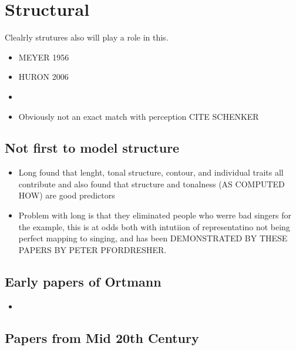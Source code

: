 \documentclass[]{book}
\providecommand{\tightlist}{%
  \setlength{\itemsep}{0pt}\setlength{\parskip}{0pt}}
\theoremstyle{definition}
\theoremstyle{definition}
\theoremstyle{definition}
\theoremstyle{remark}
\begin{document}
\hypertarget{structural}{%
\section{Structural}\label{structural}}

Clealrly strutures also will play a role in this.

\begin{itemize}
\item
  MEYER 1956
\item
  HURON 2006
\item
  \citep{margulisModelMelodicExpectation2005}
\item
  Obviously not an exact match with perception CITE SCHENKER
\end{itemize}

\hypertarget{not-first-to-model-structure}{%
\subsection{Not first to model
structure}\label{not-first-to-model-structure}}

\begin{itemize}
\tightlist
\item
  Long found that lenght, tonal structure, contour, and individual
  traits all contribute and also found that structure and tonalness (AS
  COMPUTED HOW) are good predictors
  \citep{longRelationshipsPitchMemory1977}
\item
  Problem with long is that they eliminated people who werre bad singers
  for the example, this is at odds both with intutiion of representatino
  not being perfect mapping to singing, and has been DEMONSTRATED BY
  THESE PAPERS BY PETER PFORDRESHER.
\end{itemize}

\hypertarget{early-papers-of-ortmann}{%
\subsection{Early papers of Ortmann}\label{early-papers-of-ortmann}}

\begin{itemize}
\tightlist
\item
  \citep{ortmannTonalDeterminantsMelodic1933}
\end{itemize}

\hypertarget{papers-from-mid-20th-century}{%
\subsection{Papers from Mid 20th
Century}\label{papers-from-mid-20th-century}}
\end{document}
